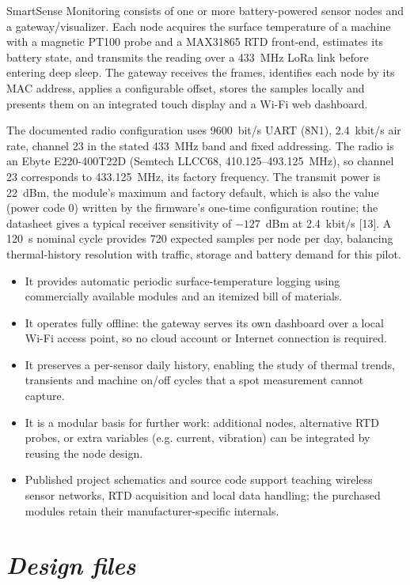 \documentclass[11pt, letterpaper]{article}
\begin{document}
SmartSense Monitoring consists of one or more battery-powered sensor nodes and a gateway/visualizer. Each node acquires the surface temperature of a machine with a magnetic PT100 probe and a MAX31865 RTD front-end, estimates its battery state, and transmits the reading over a 433~MHz LoRa link before entering deep sleep. The gateway receives the frames, identifies each node by its MAC address, applies a configurable offset, stores the samples locally and presents them on an integrated touch display and a Wi-Fi web dashboard.

The documented radio configuration uses 9600~bit/s UART (8N1), 2.4~kbit/s air rate, channel 23 in the stated 433~MHz band and fixed addressing. The radio is an Ebyte E220-400T22D (Semtech LLCC68, 410.125--493.125~MHz), so channel 23 corresponds to 433.125~MHz, its factory frequency. The transmit power is 22~dBm, the module's maximum and factory default, which is also the value (power code 0) written by the firmware's one-time configuration routine; the datasheet gives a typical receiver sensitivity of $-127$~dBm at 2.4~kbit/s [13]. A 120~s nominal cycle provides 720 expected samples per node per day, balancing thermal-history resolution with traffic, storage and battery demand for this pilot.

\begin{itemize}
\item[$\bullet$] It provides automatic periodic surface-temperature logging using commercially available modules and an itemized bill of materials.
\item[$\bullet$] It operates fully offline: the gateway serves its own dashboard over a local Wi-Fi access point, so no cloud account or Internet connection is required.
\item[$\bullet$] It preserves a per-sensor daily history, enabling the study of thermal trends, transients and machine on/off cycles that a spot measurement cannot capture.
\item[$\bullet$] It is a modular basis for further work: additional nodes, alternative RTD probes, or extra variables (e.g. current, vibration) can be integrated by reusing the node design.
\item[$\bullet$] Published project schematics and source code support teaching wireless sensor networks, RTD acquisition and local data handling; the purchased modules retain their manufacturer-specific internals.
\end{itemize}

\section*{\textit{Design files}}
\end{document}
